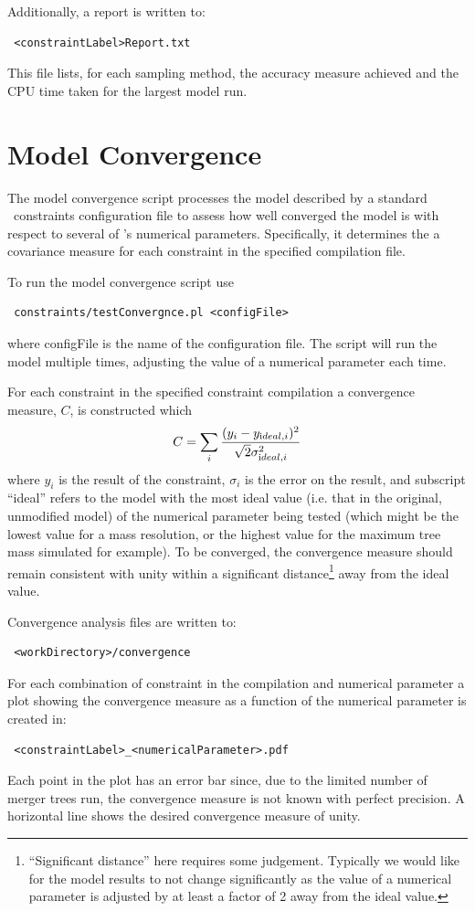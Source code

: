 Additionally, a report is written to:
\begin{verbatim}
 <constraintLabel>Report.txt
\end{verbatim}
This file lists, for each sampling method, the accuracy measure achieved and the CPU time taken for the largest model run.

\section{Model Convergence}\label{sec:ModelConvergence}

The model convergence script processes the model described by a standard \glc\ constraints configuration file to assess how well converged the model is with respect to several of \glc's numerical parameters. Specifically, it determines the a covariance measure for each constraint in the specified compilation file.

To run the model convergence script use
\begin{verbatim}
 constraints/testConvergnce.pl <configFile>
\end{verbatim}
where {\normalfont \ttfamily configFile} is the name of the configuration file. The script will run the model multiple times, adjusting the value of a numerical parameter each time.

For each constraint in the specified constraint compilation a convergence measure, $C$, is constructed which
\begin{equation}
 C = \sum_i {(y_i - y_{{\mathrm ideal}, i})^2 \over \sqrt{2} \sigma_{{\mathrm ideal}, i}^2}
\end{equation}
where $y_i$ is the result of the constraint, $\sigma_i$ is the error on the result, and subscript ``ideal'' refers to the model with the most ideal value (i.e. that in the original, unmodified model) of the numerical parameter being tested (which might be the lowest value for a mass resolution, or the highest value for the maximum tree mass simulated for example). To be converged, the convergence measure should remain consistent with unity within a significant distance\footnote{``Significant distance'' here requires some judgement. Typically we would like for the model results to not change significantly as the value of a numerical parameter is adjusted by at least a factor of 2 away from the ideal value.} away from the ideal value.

Convergence analysis files are written to:
\begin{verbatim}
 <workDirectory>/convergence
\end{verbatim}
For each combination of constraint in the compilation and numerical parameter a plot showing the convergence measure as a function of the numerical parameter is created in:
\begin{verbatim}
 <constraintLabel>_<numericalParameter>.pdf
\end{verbatim}
Each point in the plot has an error bar since, due to the limited number of merger trees run, the convergence measure is not known with perfect precision. A horizontal line shows the desired convergence measure of unity.

